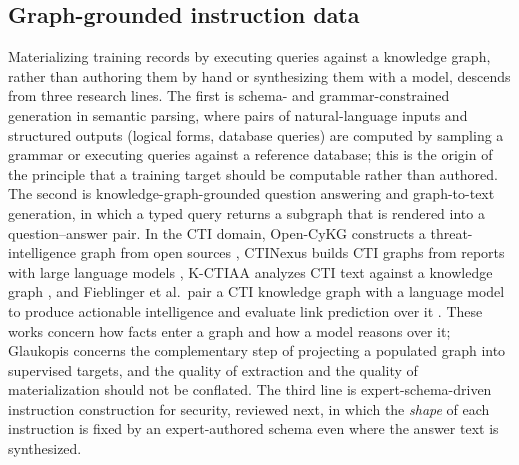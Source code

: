 \documentclass[twocolumn]{svjour3}
\begin{document}
\subsection{Graph-grounded instruction data}\label{sec:bg-graph}
Materializing training records by executing queries against a knowledge graph, rather than authoring them by hand or synthesizing them with a model, descends from three research lines. The first is schema- and grammar-constrained generation in semantic parsing, where pairs of natural-language inputs and structured outputs (logical forms, database queries) are computed by sampling a grammar or executing queries against a reference database; this is the origin of the principle that a training target should be computable rather than authored. The second is knowledge-graph-grounded question answering and graph-to-text generation, in which a typed query returns a subgraph that is rendered into a question--answer pair. In the CTI domain, Open-CyKG constructs a threat-intelligence graph from open sources \cite{sarhan2021opencykg}, CTINexus builds CTI graphs from reports with large language models \cite{cheng2024ctinexus}, K-CTIAA analyzes CTI text against a knowledge graph \cite{li2023kctiaa}, and Fieblinger et al.\ pair a CTI knowledge graph with a language model to produce actionable intelligence and evaluate link prediction over it \cite{fieblinger2024actionable}. These works concern how facts enter a graph and how a model reasons over it; Glaukopis concerns the complementary step of projecting a populated graph into supervised targets, and the quality of extraction and the quality of materialization should not be conflated. The third line is expert-schema-driven instruction construction for security, reviewed next, in which the \emph{shape} of each instruction is fixed by an expert-authored schema even where the answer text is synthesized.
\end{document}
